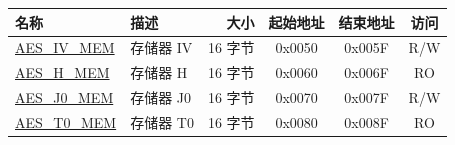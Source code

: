 \begin{longtable}{ |p{3cm} | p{3cm} | r | c | c | c |  }
\hline
\rowcolor{lightgray}
\textbf{名称} & \textbf{描述}  &  \textbf{大小}  &  \textbf{起始地址}  &  \textbf{结束地址}  & \textbf{访问}   \\ \hline
{\hyperref[memdesc:AESIVMEM]{AES\_IV\_MEM}} & 存储器 IV & 16 字节  & 0x0050 & 0x005F & R/W \\ \hline
{\hyperref[memdesc:AESHMEM]{AES\_H\_MEM}}  & 存储器 H  & 16 字节  & 0x0060 & 0x006F & RO  \\ \hline
{\hyperref[memdesc:AESJ0MEM]{AES\_J0\_MEM}} & 存储器 J0 & 16 字节  & 0x0070 & 0x007F & R/W \\ \hline
{\hyperref[memdesc:AEST0MEM]{AES\_T0\_MEM}} & 存储器 T0 & 16 字节  & 0x0080 & 0x008F & RO  \\ \hline

\end{longtable}
